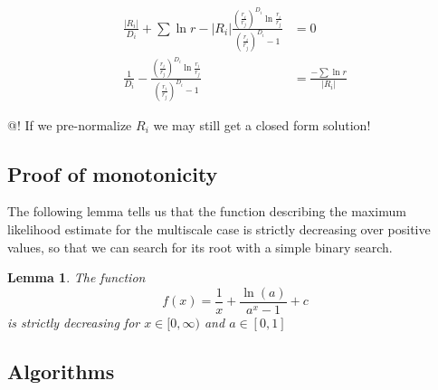 \documentclass{article}
\newtheorem{lma}{Lemma}
\begin{document}
\begin{align*}
\frac{|R_i|}{D_i} + \sum \ln r - |R_i| \frac{\left(\frac{r_i}{r_j}\right)^{D_i} \ln \frac{r_i}{r_j}}{\left(\frac{r_i}{r_j}\right)^{D_i} -1} &= 0 \\
\frac{1}{D_i}  - \frac{\left(\frac{r_i}{r_j}\right)^{D_i} \ln \frac{r_i}{r_j}}{\left(\frac{r_i}{r_j}\right)^{D_i} -1} &= \frac{-\sum \ln r}{|R_i|}
\end{align*}

@! If we pre-normalize $R_i$ we may still get a closed form solution!

\subsection{Proof of monotonicity}

The following lemma tells us that the function describing the maximum likelihood estimate for the multiscale case is strictly decreasing over positive values, so that we can search for its root with a simple binary search.

\begin{lma}
The function
\[
f(x) = \frac{1}{x} + \frac{\ln(a)}{a^x - 1} + c
\]
is strictly decreasing for $ x \in [0, \infty)$ and $ a \in [0, 1]$ 
\end{lma}
\subsection{Algorithms}
\end{document}
